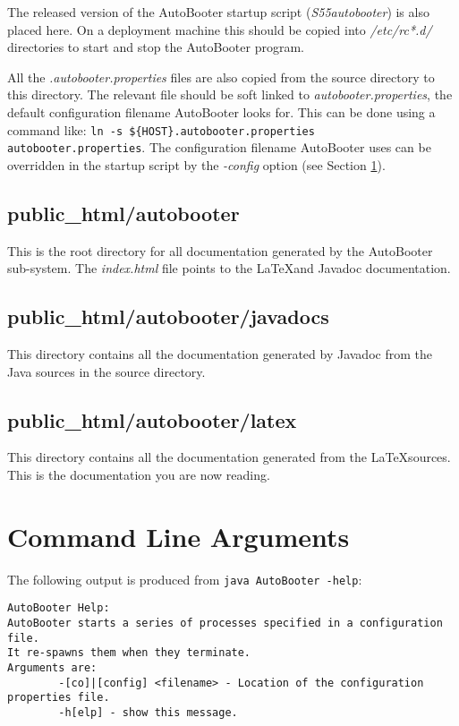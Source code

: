 \documentclass[10pt,a4paper]{article}
\begin{document}
The released version of the AutoBooter startup script ({\em S55autobooter}) is also placed here. On a 
deployment machine this should be copied into {\em /etc/rc*.d/} directories to start and stop the AutoBooter
program. 

All the {\em *.autobooter.properties} files are also copied from the source directory to this directory.
The relevant file should be soft linked to {\em autobooter.properties}, the default configuration filename
AutoBooter looks for. This can be done using a command like: 
\verb'ln -s ${HOST}.autobooter.properties autobooter.properties'. The configuration filename AutoBooter uses
can be overridden in the startup script by the {\em -config} option (see Section \ref{sec:commandlinearguments}).

\subsection{public\_html/autobooter}
This is the root directory for all documentation generated by the AutoBooter sub-system. The {\em index.html}
file points to the \LaTeX and Javadoc documentation.

\subsection{public\_html/autobooter/javadocs}
This directory contains all the documentation generated by Javadoc from the Java sources in the source directory.

\subsection{public\_html/autobooter/latex}
This directory contains all the documentation generated from the \LaTeX sources. This is the documentation you are now
reading.

\section{Command Line Arguments}
\label{sec:commandlinearguments}
The following output is produced from \verb'java AutoBooter -help':
\begin{verbatim}
AutoBooter Help:
AutoBooter starts a series of processes specified in a configuration file.
It re-spawns them when they terminate.
Arguments are:
        -[co]|[config] <filename> - Location of the configuration properties file.
        -h[elp] - show this message.
\end{verbatim}
\end{document}
